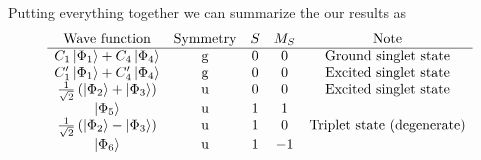 \documentclass[../Main/chem532-notes.tex]{subfiles}
\begin{document}
Putting everything together we can summarize the our results as
\begin{equation*}
   \begin{array}{ccccc}
    \text{Wave function} & \text{Symmetry} & S & M_S & \text{Note}\\
    \hline
    C_1 \ket{\Phi_1} + C_4 \ket{\Phi_4} & \mathrm{g} & 0 & 0 & \text{Ground singlet state}\\
    C'_1 \ket{\Phi_1} + C'_4 \ket{\Phi_4} & \mathrm{g} & 0 & 0 & \text{Excited singlet state} \\ 
    \frac{1}{\sqrt{2}} \left(  \ket{\Phi_2} + \ket{\Phi_3} \right) & \mathrm{u} & 0 & 0 & \text{Excited singlet state}\\
        \ket{\Phi_5} & \mathrm{u} & 1 & 1 & \\    
        \frac{1}{\sqrt{2}} \left(  \ket{\Phi_2} - \ket{\Phi_3} \right) & \mathrm{u} & 1 & 0 & \text{Triplet state (degenerate)}\\
        \ket{\Phi_6} & \mathrm{u} & 1 & -1 &
   \end{array}
\end{equation*}
\end{document}
